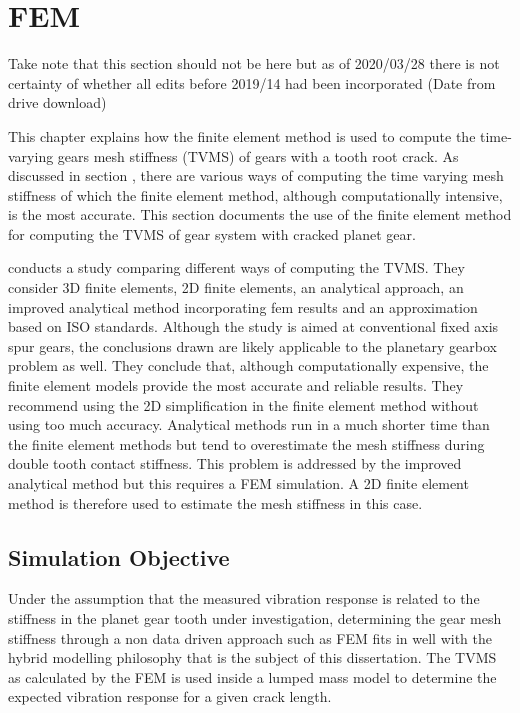 


\chapter{FEM}
Take note that this section should not be here but as of 2020/03/28 there is not certainty of whether all edits before 2019/14 had been incorporated (Date from drive download)

This chapter explains how the finite element method is used to compute the time-varying gears mesh stiffness (TVMS) of gears with a tooth root crack. As discussed in section \cite{not yet discussed}, there are various ways of computing the time varying mesh stiffness of which the finite element method, although computationally intensive, is the most accurate. This section documents the use of the finite element method for computing the TVMS of gear system with cracked planet gear.


\cite{Yu2017a} conducts a study comparing different ways of computing the TVMS. They consider 3D finite elements, 2D finite elements, an analytical approach, an improved analytical method incorporating fem results and an approximation based on ISO standards. Although the study is aimed at conventional fixed axis spur gears, the conclusions drawn are likely applicable to the planetary gearbox problem as well. They conclude that, although computationally expensive, the finite element models provide the most accurate and reliable results. They recommend using the 2D simplification in the finite element method without using too much accuracy. Analytical methods run in a much shorter time than the finite element methods but tend to overestimate the mesh stiffness during double tooth contact stiffness. This problem is addressed by the improved analytical method but this requires a FEM simulation. A 2D finite element method is therefore used to estimate the mesh stiffness in this case. 




\section{Simulation Objective}
Under the assumption that the measured vibration response is related to the stiffness in the planet gear tooth under investigation, determining the gear mesh stiffness through a non data driven approach such as FEM fits in well with the hybrid modelling philosophy that is the subject of this dissertation. The TVMS as calculated by the FEM is used inside a lumped mass model to determine the expected vibration response for a given crack length. 

